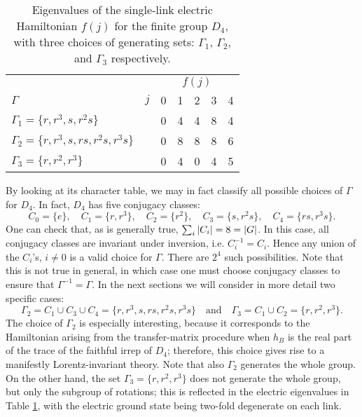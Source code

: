 \begin{table}[t]
    \centering
    \begin{tabular}{lcccccc}
        \toprule
         & & \multicolumn{5}{c}{$f(j)$} \\
        \cmidrule(l){3-7}
        \hspace{5em}$\Gamma$ & $j$ & 0 & 1 & 2 & 3 & 4\\
        \midrule
        $\Gamma_1 = \{r, r^3, s, r^2 s \}$
                 & & 0 & 4 & 4 & 8 & 4 \\[5pt]
        $\Gamma_2 = \{r, r^3, s, r s, r^2 s, r^3 s \}$
                       & & 0 & 8 & 8 & 8 & 6 \\[5pt]
        $\Gamma_3 = \{r, r^2, r^3 \}$
                 & & 0 & 4 & 0 & 4 & 5 \\
        \bottomrule
    \end{tabular}
    \caption{Eigenvalues of the single-link electric Hamiltonian $f(j)$ for the finite group $D_4$, with three choices of generating sets: $\Gamma_1$, $\Gamma_2$, and $\Gamma_3$ respectively.}
    \label{tab:fval}
\end{table}

By looking at its character table, we may in fact classify all possible choices of $\Gamma$ for $D_4$.
In fact, $D_4$ has five conjugacy classes:
\begin{equation*}
    C_0 = \{e\}, \quad
    C_1 = \{r, r^3\}, \quad
    C_2 = \{r^2\}, \quad
    C_3 = \{s, r^2s\}, \quad
    C_4 = \{rs, r^3s\}.
\end{equation*}
One can check that, as is generally true, $\sum_i \abs{C_i}=8=\abs{G}$.
In this case, all conjugacy classes are invariant under inversion, i.e.
$C_i^{-1}=C_i$.
 Hence any union of the $C_i$'s, $i \neq 0$ is a valid choice for $\Gamma$.
There are $2^4$ such possibilities.
Note that this is not true in general, in which case one must choose conjugacy classes to ensure that $\Gamma^{-1}=\Gamma$.
In the next sections we will consider in more detail two specific cases:
\begin{equation*}
        \Gamma_2 = C_1 \cup C_3 \cup C_4=\{r, r^3, s, rs, r^2s, r^3s\}
        \quad \text{and} \quad
        \Gamma_3 = C_1 \cup C_2 = \{r, r^2, r^3\}.
\end{equation*}
The choice of $\Gamma_2$ is especially interesting, because it corresponds to the Hamiltonian arising from the transfer-matrix procedure when $h_B$ is the real part of the trace of the faithful irrep of $D_4$; therefore, this choice gives rise to a manifestly Lorentz-invariant theory.
Note that also $\Gamma_2$ generates the whole group.
On the other hand, the set $\Gamma_3 = \{r, r^2, r^3\}$ does not generate the whole group, but only the subgroup of rotations;
this is reflected in the electric eigenvalues in Table \ref{tab:fval}, with the electric ground state being two-fold degenerate on each link.

